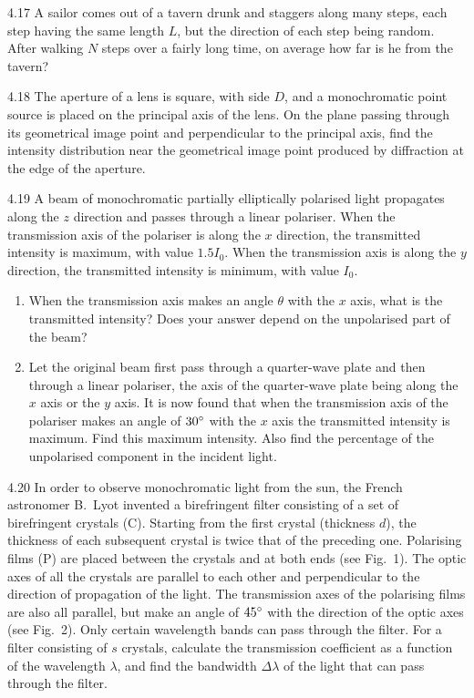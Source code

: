 \begin{problem}{4.17}
A sailor comes out of a tavern drunk and staggers along many steps, each step having the same length $L$, but the direction of each step being random. After walking $N$ steps over a fairly long time, on average how far is he from the tavern?
\end{problem}

\begin{problem}{4.18}
The aperture of a lens is square, with side $D$, and a monochromatic point source is placed on the principal axis of the lens. On the plane passing through its geometrical image point and perpendicular to the principal axis, find the intensity distribution near the geometrical image point produced by diffraction at the edge of the aperture.
\end{problem}

\begin{problem}{4.19}
A beam of monochromatic partially elliptically polarised light propagates along the $z$ direction and passes through a linear polariser. When the transmission axis of the polariser is along the $x$ direction, the transmitted intensity is maximum, with value $1.5I_0$. When the transmission axis is along the $y$ direction, the transmitted intensity is minimum, with value $I_0$.
\begin{enumerate}[label=(\arabic*),leftmargin=2.2em,itemsep=2pt,topsep=2pt]
\item When the transmission axis makes an angle $\theta$ with the $x$ axis, what is the transmitted intensity? Does your answer depend on the unpolarised part of the beam?
\item Let the original beam first pass through a quarter-wave plate and then through a linear polariser, the axis of the quarter-wave plate being along the $x$ axis or the $y$ axis. It is now found that when the transmission axis of the polariser makes an angle of $30^{\circ}$ with the $x$ axis the transmitted intensity is maximum. Find this maximum intensity. Also find the percentage of the unpolarised component in the incident light.
\end{enumerate}
\end{problem}

\begin{problem}{4.20}
In order to observe monochromatic light from the sun, the French astronomer B.~Lyot invented a birefringent filter consisting of a set of birefringent crystals (C). Starting from the first crystal (thickness $d$), the thickness of each subsequent crystal is twice that of the preceding one. Polarising films (P) are placed between the crystals and at both ends (see Fig.~1). The optic axes of all the crystals are parallel to each other and perpendicular to the direction of propagation of the light. The transmission axes of the polarising films are also all parallel, but make an angle of $45^{\circ}$ with the direction of the optic axes (see Fig.~2). Only certain wavelength bands can pass through the filter. For a filter consisting of $s$ crystals, calculate the transmission coefficient as a function of the wavelength $\lambda$, and find the bandwidth $\Delta\lambda$ of the light that can pass through the filter.
\end{problem}

